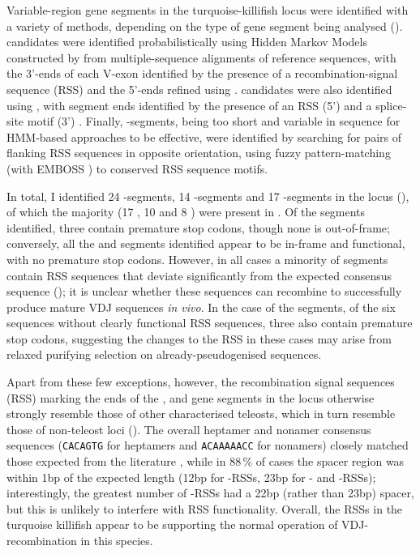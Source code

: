 Variable-region gene segments in the turquoise-killifish \igh{} locus were identified with a variety of methods, depending on the type of gene segment being analysed (). \vh candidates were identified probabilistically using Hidden Markov Models constructed by  \parencite{wheeler2013nhmmer} from  \parencite{loytynoja2014prank} multiple-sequence alignments of reference sequences, with the 3'-ends of each V-exon identified by the presence of a recombination-signal sequence (RSS) \parencite{schroeder2010immunoglobulins} and the 5'-ends refined using  \parencite{ehrenmann2011domaingapalign}. \jh candidates were also identified using , with segment ends identified by the presence of an RSS (5') and a  splice-site motif (3') \parencite{magadan2011medaka}. Finally, \dh-segments, being too short and variable in sequence for HMM-based approaches to be effective, were identified by searching for pairs of flanking RSS sequences in opposite orientation, using fuzzy pattern-matching (with EMBOSS  \parencite{rice2000emboss}) to conserved RSS sequence motifs.
	 
In total, I identified 24 \vh-segments, 14 \dh-segments and 17 \jh-segments in the \Nfu locus (), of which the majority (17 \vh, 10 \dh and 8 \jh) were present in . Of the \vh segments identified, three contain premature stop codons, though none is out-of-frame; conversely, all the \dh and \jh segments identified appear to be in-frame and functional, with no premature stop codons. However, in all cases a minority of segments contain RSS sequences that deviate significantly from the expected consensus sequence (); it is unclear whether these sequences can recombine to successfully produce mature VDJ sequences \textit{in vivo}. In the case of the \vh segments, of the six sequences without clearly functional RSS sequences, three also contain premature stop codons, suggesting the changes to the RSS in these cases may arise from relaxed purifying selection on already-pseudogenised sequences.

Apart from these few exceptions, however, the recombination signal sequences (RSS) marking the ends of the \vh, \dh and \jh gene segments in the \Nfu locus otherwise strongly resemble those of other characterised teleosts, which in turn resemble those of non-teleost loci (). The overall heptamer and nonamer consensus sequences (\texttt{CACAGTG} for heptamers and \texttt{ACAAAAACC} for nonamers) closely matched those expected from the literature \parencite{schroeder2010immunoglobulins}, while in 88\,\% of cases the spacer region was within 1bp of the expected length (12bp for \dh-RSSs, 23bp for \vh- and \jh-RSSs); interestingly, the greatest number of \vh-RSSs had a 22bp (rather than 23bp) spacer, but this is unlikely to interfere with RSS functionality. Overall, the RSSs in the turquoise killifish appear to be supporting the normal operation of VDJ-recombination in this species.

